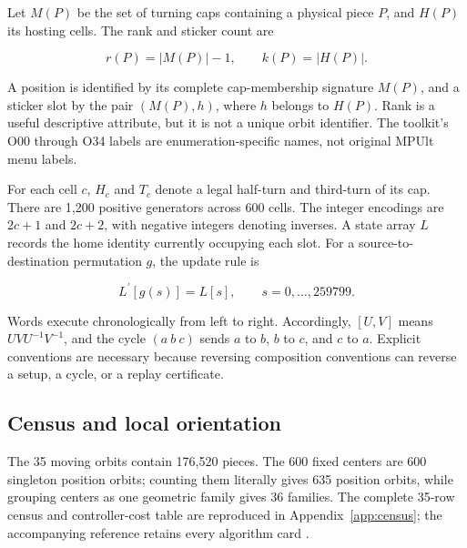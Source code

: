 \documentclass[a4paper,11pt]{article}
\begin{document}
Let \(M(P)\) be the set of turning caps containing a physical piece \(P\), and \(H(P)\) its hosting cells. The rank and sticker count are

\begin{equation}
r(P)=\lvert M(P)\rvert-1,\qquad k(P)=\lvert H(P)\rvert.
\label{eq:addresses}
\end{equation}

A position is identified by its complete cap-membership signature \(M(P)\), and a sticker slot by the pair \((M(P),h)\), where \(h\) belongs to \(H(P)\). Rank is a useful descriptive attribute, but it is not a unique orbit identifier. The toolkit's O00 through O34 labels are enumeration-specific names, not original MPUlt menu labels.

For each cell \(c\), \(H_{c}\) and \(T_{c}\) denote a legal half-turn and third-turn of its cap. There are 1,200 positive generators across 600 cells. The integer encodings are \(2c+1\) and \(2c+2\), with negative integers denoting inverses. A state array \(L\) records the home identity currently occupying each slot. For a source-to-destination permutation \(g\), the update rule is

\begin{equation}
L^{\prime}[g(s)]=L[s],\qquad s=0,\ldots,259799.
\label{eq:state-update}
\end{equation}

Words execute chronologically from left to right. Accordingly, \([U,V]\) means \(UVU^{-1}V^{-1}\), and the cycle \((a\ b\ c)\) sends \(a\) to \(b\), \(b\) to \(c\), and \(c\) to \(a\). Explicit conventions are necessary because reversing composition conventions can reverse a setup, a cycle, or a replay certificate.

\subsection{Census and local orientation}

The 35 moving orbits contain 176,520 pieces. The 600 fixed centers are 600 singleton position orbits; counting them literally gives 635 position orbits, while grouping centers as one geometric family gives 36 families. The complete 35-row census and controller-cost table are reproduced in Appendix~\ref{app:census}; the accompanying reference retains every algorithm card \cite{algorithms}.
\end{document}

